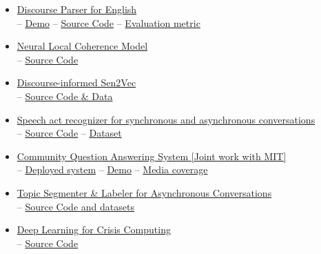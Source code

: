 \documentclass[paper=letter,fontsize=11pt]{scrartcl} %
\begin{document}
\begin{itemize}

\item \href{http://alt.qcri.org/tools/discourse-parser/}{Discourse Parser for English}\\ {-- \href{http://alt.qcri.org/demos/Discourse_Parser_Demo/} {Demo} -- \href{http://alt.qcri.org/tools/discourse-parser/}{Source Code} -- \href{http://alt.qcri.org/tools/discourse-eval/} {Evaluation metric}}

\item \href{http://alt.qcri.org/tools/speech-act/}{Neural Local Coherence Model}\\ {-- \href{https://github.com/datienguyen/cnn_coherence/}{Source Code}}

\item \href{http://alt.qcri.org/tools/speech-act/}{Discourse-informed Sen2Vec}\\ {-- \href{https://gitlab.com/tksaha/sen2vec}{Source Code \& Data}}


\item \href{http://alt.qcri.org/tools/speech-act/}{Speech act recognizer for synchronous and asynchronous conversations}\\ {-- \href{http://alt.qcri.org/tools/speech-act/}{Source Code} -- \href{http://alt.qcri.org/tools/speech-act/} {Dataset}}

\item \href{http://www.qatarliving.com/betasearch}{Community Question Answering System [Joint work with MIT]}\\ {-- \href{http://www.qatarliving.com/betasearch} {Deployed system} -- \href{http://www.qatarliving.com/betasearch} {Demo} -- \href{http://www.qna.org.qa/en-us/News/16032718350063/QCRI-Collaborates-with-Qatar-Living-to-Improve-Online-Search} {Media coverage}}

\item \href{https://www.cs.ubc.ca/cs-research/lci/research-groups/natural-language-processing/Software.html}{Topic Segmenter \& Labeler for Asynchronous Conversations}\\ {-- \href{https://www.cs.ubc.ca/cs-research/lci/research-groups/natural-language-processing/Software.html} {Source Code and datasets}}

\item \href{https://github.com/CrisisNLP/deep-learning-for-big-crisis-data}{Deep Learning for Crisis Computing}\\ {-- \href{https://github.com/CrisisNLP/deep-learning-for-big-crisis-data}{Source Code} }


\end{itemize}
\end{document}
